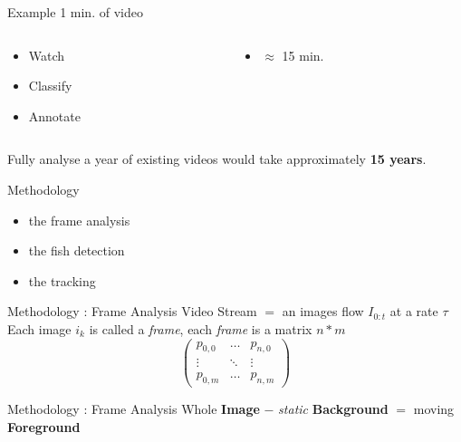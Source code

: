 \documentclass{beamer}
\begin{document}
\begin{frame}[c]{Example}
1 min. of video
\begin{columns}
	\begin{column}{0.5\textwidth}
			\begin{itemize}
				\item Watch
				\item Classify
				\item Annotate
			\end{itemize}
	\end{column}
	\pause
	\begin{column}{0.5\textwidth}
			\begin{itemize}
				\item $\approx$ 15 min.
			\end{itemize}
	\end{column}
\end{columns}
	\pause
\bigskip	
\center Fully analyse a year of existing videos would take approximately \textbf{15 years}.
\end{frame}

\begin{frame}[c]{Methodology}
\center
\begin{itemize}
\item the frame analysis
\item the fish detection
\item the tracking
\end{itemize}
\end{frame}

\begin{frame}[c]{Methodology : Frame Analysis}
\center
Video Stream $=$ an images flow $I_{0:t}$ at a rate $\tau$ \\
\pause
\bigskip
Each image $i_k$ is called a \textit{frame}, each \textit{frame} is a matrix $n*m$ 
\[ \left( \begin{array}{ccc}
p_{0,0} & \ldots & p_{n,0} \\
\vdots & \ddots & \vdots \\
p_{0,m} & \ldots & p_{n,m} \end{array} \right)\] 
\end{frame}

\begin{frame}[c]{Methodology : Frame Analysis}
\center
Whole \textbf{Image} $-$ \textit{static} \textbf{Background} $=$ moving \textbf{Foreground}\\
\centering %
\end{frame}
\end{document}
